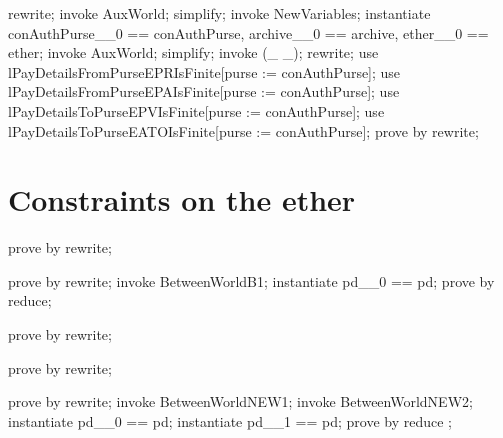 \begin{LPScript}\begin{zproof}[tAuxWorldDoesNotAddConstraints]
    rewrite;
    invoke AuxWorld;
    simplify;
    invoke NewVariables;
    instantiate
      conAuthPurse\_\_0 == conAuthPurse, archive\_\_0 == archive,
      ether\_\_0 == ether;
    invoke AuxWorld;
    simplify;
    invoke (\_ \rel \_);
    rewrite;
    use lPayDetailsFromPurseEPRIsFinite[purse := conAuthPurse];
    use lPayDetailsFromPurseEPAIsFinite[purse := conAuthPurse];
    use lPayDetailsToPurseEPVIsFinite[purse := conAuthPurse];
    use lPayDetailsToPurseEATOIsFinite[purse := conAuthPurse];
    prove by rewrite;
\end{zproof}\end{LPScript}

\section{Constraints on the ether}

\begin{LDCheck}\begin{zproof}
   prove by rewrite;
\end{zproof}\end{LDCheck}

\begin{LDCheck}\begin{zproof}
    prove by rewrite;
    invoke BetweenWorldB1;
    instantiate pd\_\_0 == pd;
    prove by reduce;
\end{zproof}\end{LDCheck}

\begin{LDCheck}\begin{zproof}
   prove by rewrite;
\end{zproof}\end{LDCheck}

\begin{LDCheck}\begin{zproof}
   prove by rewrite;
\end{zproof}\end{LDCheck}

\begin{LDCheck}\begin{zproof}
   prove by rewrite;
   invoke BetweenWorldNEW1;
   invoke BetweenWorldNEW2;
   instantiate pd\_\_0 == pd;
   instantiate pd\_\_1 == pd;
   prove by reduce ;
\end{zproof}\end{LDCheck}

